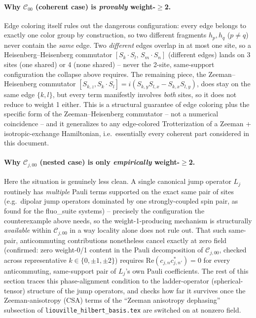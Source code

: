 \documentclass[11pt]{article}
\newcommand{\calC}{\mathcal{C}}
\begin{document}
\paragraph{Why $\calC_{00}$ (coherent case) is \emph{provably} weight-$\ge$2.} Edge coloring itself rules out the dangerous configuration: every edge belongs to exactly one color group by construction, so two different fragments $h_p,h_q$ ($p\ne q$) never contain the \emph{same} edge. Two \emph{different} edges overlap in at most one site, so a Heisenberg--Heisenberg commutator $[S_k\cdot S_l,\,S_m\cdot S_n]$ (different edges) lands on 3 sites (one shared) or 4 (none shared) -- never the 2-site, same-support configuration the collapse above requires. The remaining piece, the Zeeman--Heisenberg commutator $[S_{k,z},S_k\cdot S_l]=i(S_{k,y}S_{l,x}-S_{k,x}S_{l,y})$, does stay on the same edge $\{k,l\}$, but every term manifestly involves \emph{both} sites, so it does not reduce to weight 1 either. This is a structural guarantee of edge coloring plus the specific form of the Zeeman--Heisenberg commutator -- not a numerical coincidence -- and it generalizes to any edge-colored Trotterization of a Zeeman + isotropic-exchange Hamiltonian, i.e.\ essentially every coherent part considered in this document.

\paragraph{Why $\calC_{j,00}$ (nested case) is only \emph{empirically} weight-$\ge$2.} Here the situation is genuinely less clean. A single canonical jump operator $L_j$ routinely has \emph{multiple} Pauli terms supported on the exact same pair of sites (e.g.\ dipolar jump operators dominated by one strongly-coupled spin pair, as found for the fluo\_suite systems) -- precisely the configuration the counterexample above needs, so the weight-1-producing mechanism is structurally \emph{available} within $\calC_{j,00}$ in a way locality alone does not rule out. That such same-pair, anticommuting contributions nonetheless cancel exactly at zero field (confirmed: zero weight-0/1 content in the Pauli decomposition of $\calC_{j,00}$, checked across representative $k\in\{0,\pm1,\pm2\}$) requires $\text{Re}(c_{j,n}c_{j,n'}^*)=0$ for every anticommuting, same-support pair of $L_j$'s own Pauli coefficients. The rest of this section traces this phase-alignment condition to the ladder-operator (spherical-tensor) structure of the jump operators, and checks how far it survives once the Zeeman-anisotropy (CSA) terms of the ``Zeeman anisotropy dephasing'' subsection of \texttt{liouville\_hilbert\_basis.tex} are switched on at nonzero field.
\end{document}
